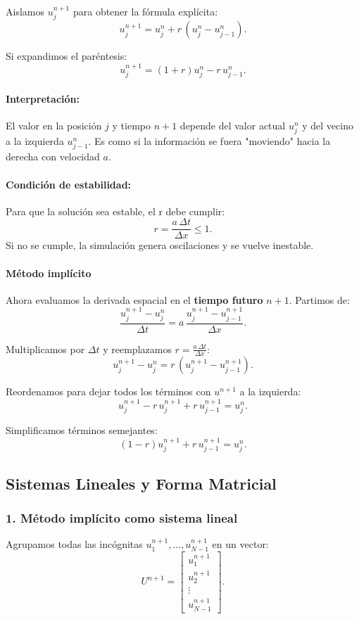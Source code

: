 \documentclass[12pt,a4paper]{article}
\begin{document}
Aislamos \(u_j^{n+1}\) para obtener la fórmula explícita:
\[
u_j^{n+1} = u_j^n + r\,(u_j^n - u_{j-1}^n).
\]

Si expandimos el paréntesis:
\[
u_j^{n+1} = (1+r)u_j^n - r\,u_{j-1}^n.
\]

\paragraph{Interpretación:}
El valor en la posición \(j\) y tiempo \(n+1\) depende del valor actual \(u_j^n\) y del vecino a la izquierda \(u_{j-1}^n\).  
Es como si la información se fuera "moviendo" hacia la derecha con velocidad \(a\).

\paragraph{Condición de estabilidad:}  
Para que la solución sea estable, el r debe cumplir:
\[
r = \frac{a\,\Delta t}{\Delta x} \leq 1.
\]
Si no se cumple, la simulación genera oscilaciones y se vuelve inestable.

\paragraph{Método implícito}

Ahora evaluamos la derivada espacial en el \textbf{tiempo futuro} \(n+1\).  
Partimos de:
\[
\frac{u_j^{n+1}-u_j^n}{\Delta t} = a\,\frac{u_j^{n+1} - u_{j-1}^{n+1}}{\Delta x}.
\]

Multiplicamos por \(\Delta t\) y reemplazamos \(r = \frac{a\,\Delta t}{\Delta x}\):
\[
u_j^{n+1}-u_j^n = r\,(u_j^{n+1}-u_{j-1}^{n+1}).
\]

Reordenamos para dejar todos los términos con \(u^{n+1}\) a la izquierda:
\[
u_j^{n+1} - r\,u_j^{n+1} + r\,u_{j-1}^{n+1} = u_j^n.
\]

Simplificamos términos semejantes:
\[
(1-r)u_j^{n+1} + r\,u_{j-1}^{n+1} = u_j^n.
\]
\subsection{Sistemas Lineales y Forma Matricial}
\subsubsection*{1. Método implícito como sistema lineal}
Agrupamos todas las incógnitas \(u_1^{n+1}, \dots, u_{N-1}^{n+1}\) en un vector:
\[
U^{n+1} = 
\begin{bmatrix}
u_1^{n+1}\\
u_2^{n+1}\\
\vdots\\
u_{N-1}^{n+1}
\end{bmatrix}.
\]
\end{document}
